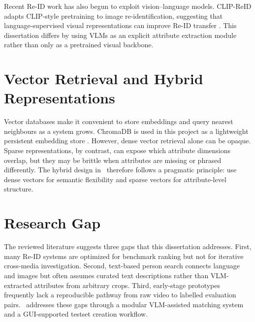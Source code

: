Recent Re-ID work has also begun to exploit vision--language models. CLIP-ReID adapts CLIP-style pretraining to image re-identification, suggesting that language-supervised visual representations can improve Re-ID transfer \citep{li2023clipreid}. This dissertation differs by using VLMs as an explicit attribute extraction module rather than only as a pretrained visual backbone.

\section{Vector Retrieval and Hybrid Representations}

Vector databases make it convenient to store embeddings and query nearest neighbours as a system grows. ChromaDB is used in this project as a lightweight persistent embedding store \citep{chroma2024}. However, dense vector retrieval alone can be opaque. Sparse representations, by contrast, can expose which attribute dimensions overlap, but they may be brittle when attributes are missing or phrased differently. The hybrid design in \systemname\ therefore follows a pragmatic principle: use dense vectors for semantic flexibility and sparse vectors for attribute-level structure.

\section{Research Gap}

The reviewed literature suggests three gaps that this dissertation addresses. First, many Re-ID systems are optimized for benchmark ranking but not for iterative cross-media investigation. Second, text-based person search connects language and images but often assumes curated text descriptions rather than VLM-extracted attributes from arbitrary crops. Third, early-stage prototypes frequently lack a reproducible pathway from raw video to labelled evaluation pairs. \systemname\ addresses these gaps through a modular VLM-assisted matching system and a GUI-supported testset creation workflow.
